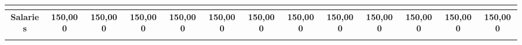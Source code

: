 \begin{center}
\begin{table}[!htbp]
{\begin{tabular}{|c|c|c|c|c|c|c|c|c|c|c|c|c|}
\multicolumn{13}{|c|}{\cellcolor[HTML]{C0C0C0}{\color[HTML]{343434} \textbf{Opex}}}                                                                                                                                                                                                                                                                                                                                                                                                                                                                                                                                                                                                                                                                                                                                                                                                                                                                                                                                                                      \\ \hline
\rowcolor[HTML]{FFFFFF} 
\textbf{Salaries}                                                                                   & \cellcolor[HTML]{FFFFFF}\textbf{150,000}                  & \textbf{150,000}                         & \textbf{150,000}                         & \textbf{150,000}                         & \textbf{150,000}                                                                         & \textbf{150,000}                                                                         & \textbf{150,000}                                                                         & \textbf{150,000}                                                                         & \textbf{150,000}                                                                         & \textbf{150,000}                                                                         & \textbf{150,000}                                                                         & \textbf{150,000}                                                                         \\ \hline
\rowcolor[HTML]{FFFFFF} 

\end{tabular}}
\end{table}
\end{center}
